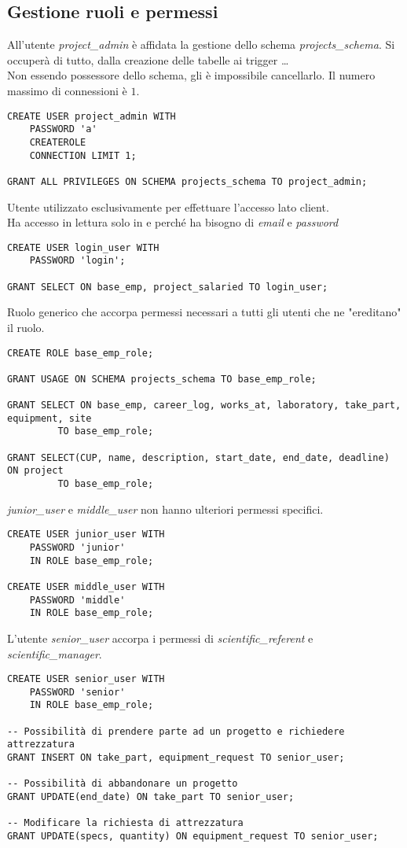 \subsection{Gestione ruoli e permessi}
All'utente \textit{project\_admin} è affidata la gestione dello schema \textit{projects\_schema}. Si occuperà di tutto, dalla creazione delle tabelle ai trigger \dots\\
Non essendo possessore dello schema, gli è impossibile cancellarlo.\sskip
Il numero massimo di connessioni è $1$.
\begin{lstlisting}
CREATE USER project_admin WITH 
    PASSWORD 'a'
    CREATEROLE
    CONNECTION LIMIT 1;

GRANT ALL PRIVILEGES ON SCHEMA projects_schema TO project_admin;
\end{lstlisting}\medskip
Utente utilizzato esclusivamente per effettuare l'accesso lato client.\\
Ha accesso in lettura solo in \textit{\baseemp} e \textit{\projectsalaried} perché ha bisogno di \textit{email} e \textit{password}
\begin{lstlisting}
CREATE USER login_user WITH
	PASSWORD 'login';

GRANT SELECT ON base_emp, project_salaried TO login_user;
\end{lstlisting}
\newpage \noindent
Ruolo generico che accorpa permessi necessari a tutti gli utenti che ne "ereditano" il ruolo.
\begin{lstlisting}
CREATE ROLE base_emp_role;

GRANT USAGE ON SCHEMA projects_schema TO base_emp_role;

GRANT SELECT ON base_emp, career_log, works_at, laboratory, take_part, equipment, site 
	     TO base_emp_role;

GRANT SELECT(CUP, name, description, start_date, end_date, deadline) ON project 
	     TO base_emp_role;
\end{lstlisting}\medskip
\textit{junior\_user} e \textit{middle\_user} non hanno ulteriori permessi specifici.
\begin{lstlisting}
CREATE USER junior_user WITH 
	PASSWORD 'junior'
	IN ROLE base_emp_role;

CREATE USER middle_user WITH
	PASSWORD 'middle'
	IN ROLE base_emp_role;
\end{lstlisting}\medskip
L'utente \textit{senior\_user} accorpa i permessi di \textit{scientific\_referent} e \textit{scientific\_manager}.
\begin{lstlisting}
CREATE USER senior_user WITH
	PASSWORD 'senior'
	IN ROLE base_emp_role;

-- Possibilità di prendere parte ad un progetto e richiedere attrezzatura
GRANT INSERT ON take_part, equipment_request TO senior_user; 

-- Possibilità di abbandonare un progetto
GRANT UPDATE(end_date) ON take_part TO senior_user;

-- Modificare la richiesta di attrezzatura
GRANT UPDATE(specs, quantity) ON equipment_request TO senior_user;
\end{lstlisting}
